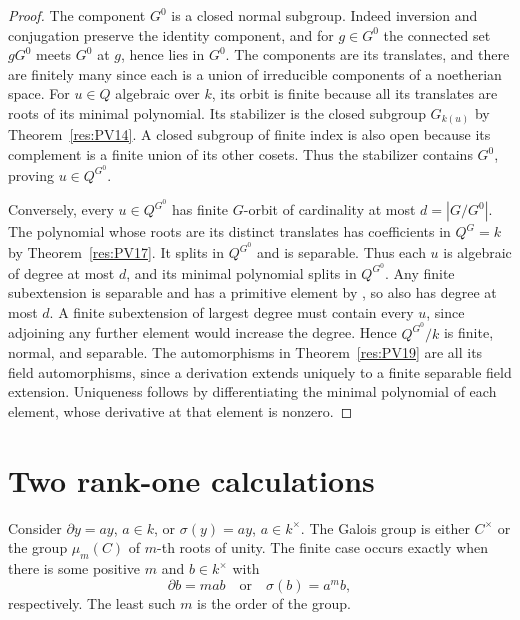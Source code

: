 \begin{proof}
The component \(G^0\) is a closed normal subgroup.
Indeed inversion and conjugation preserve the identity component,
and for \(g\in G^0\) the connected set \(gG^0\) meets \(G^0\) at
\(g\), hence lies in \(G^0\). The components are its translates, and
there are finitely many since each is a union of irreducible
components of a noetherian space.
For \(u\in Q\) algebraic over \(k\), its orbit is finite because
all its translates are roots of its minimal polynomial.
Its stabilizer is the closed subgroup \(G_{k(u)}\) by
Theorem~\ref{res:PV14}. A closed subgroup of finite index is also
open because its complement is a finite union of its other cosets.
Thus the stabilizer contains \(G^0\), proving \(u\in Q^{G^0}\).

Conversely, every \(u\in Q^{G^0}\) has finite \(G\)-orbit of
cardinality at most \(d=|G/G^0|\). The polynomial whose roots are its
distinct translates has coefficients in \(Q^G=k\) by
Theorem~\ref{res:PV17}. It splits in \(Q^{G^0}\) and is separable.
Thus each \(u\) is algebraic of degree at most \(d\), and its minimal
polynomial splits in \(Q^{G^0}\). Any finite subextension is
separable and has a primitive element by
\cite[Section 14.31, PDF p.~113]{mg-d07}, so also has degree at most
\(d\). A finite subextension of largest degree must contain
every \(u\), since adjoining any further element would increase the
degree. Hence \(Q^{G^0}/k\) is finite, normal, and separable. The
automorphisms in Theorem~\ref{res:PV19} are all its field
automorphisms, since a derivation extends uniquely to a finite
separable field extension. Uniqueness follows by differentiating
the minimal polynomial of each element, whose derivative at that
element is nonzero.
\end{proof}

\section{Two rank-one calculations}

\begin{corollary}
\label{res:PV21}
Consider \(\partial y=a y\), \(a\in k\), or
\(\sigma(y)=a y\), \(a\in k^\times\). The Galois group is
either \(C^\times\) or the group \(\mu_m(C)\) of \(m\)-th roots
of unity. The finite case occurs exactly when there is some
positive \(m\) and \(b\in k^\times\) with
\[
 \partial b=ma b \quad\text{or}\quad \sigma(b)=a^m b,
\]
respectively. The least such \(m\) is the order of the group.
\end{corollary}


